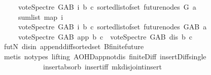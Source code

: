 \begin{isabellebody}
\ \ \ \ \ {\isacharparenleft}{\kern0pt}vote{\isacharunderscore}{\kern0pt}Spectre\ G{\isacharunderscore}{\kern0pt}AB\ i\ b\ c{\isacharparenright}{\kern0pt}{\isacharparenright}{\kern0pt}\ {\isacharparenleft}{\kern0pt}sorted{\isacharunderscore}{\kern0pt}list{\isacharunderscore}{\kern0pt}of{\isacharunderscore}{\kern0pt}set\ {\isacharparenleft}{\kern0pt}future{\isacharunderscore}{\kern0pt}nodes\ G\ a{\isacharparenright}{\kern0pt}{\isacharparenright}{\kern0pt}{\isacharparenright}{\kern0pt}\isanewline
\ \ \ \ {\isacharequal}{\kern0pt}\ sum{\isacharunderscore}{\kern0pt}list\ {\isacharparenleft}{\kern0pt}map\ {\isacharparenleft}{\kern0pt}{\isasymlambda}i{\isachardot}{\kern0pt}\isanewline
\ \ \ \ \ {\isacharparenleft}{\kern0pt}vote{\isacharunderscore}{\kern0pt}Spectre\ G{\isacharunderscore}{\kern0pt}AB\ i\ b\ c{\isacharparenright}{\kern0pt}{\isacharparenright}{\kern0pt}\ {\isacharparenleft}{\kern0pt}sorted{\isacharunderscore}{\kern0pt}list{\isacharunderscore}{\kern0pt}of{\isacharunderscore}{\kern0pt}set\ {\isacharparenleft}{\kern0pt}future{\isacharunderscore}{\kern0pt}nodes\ G{\isacharunderscore}{\kern0pt}AB\ a{\isacharparenright}{\kern0pt}{\isacharparenright}{\kern0pt}{\isacharparenright}{\kern0pt}\isanewline
\ \ \ \ {\isacharminus}{\kern0pt}\ {\isacharparenleft}{\kern0pt}vote{\isacharunderscore}{\kern0pt}Spectre\ G{\isacharunderscore}{\kern0pt}AB\ app\ b\ c{\isacharparenright}{\kern0pt}\ {\isacharminus}{\kern0pt}\ {\isacharparenleft}{\kern0pt}vote{\isacharunderscore}{\kern0pt}Spectre\ G{\isacharunderscore}{\kern0pt}AB\ dis\ b\ c{\isacharparenright}{\kern0pt}{\isachardoublequoteclose}\isanewline
\ \ \ \ \ \ \ \ \isamarkupfalse%
\ futN\ disin\ append{\isacharunderscore}{\kern0pt}diff{\isacharunderscore}{\kern0pt}sorted{\isacharunderscore}{\kern0pt}set\ B{}{\isachardot}{\kern0pt}finite{\isacharunderscore}{\kern0pt}future\isanewline
\ \ \ \ \ \ \ \ \isamarkupfalse%
\ {\isacharparenleft}{\kern0pt}metis\ {\isacharparenleft}{\kern0pt}no{\isacharunderscore}{\kern0pt}types{\isacharcomma}{\kern0pt}\ lifting{\isacharparenright}{\kern0pt}\ AOHD{\isachardot}{\kern0pt}app{\isacharunderscore}{\kern0pt}not{\isacharunderscore}{\kern0pt}dis\ finite{\isacharunderscore}{\kern0pt}Diff\ insert{\isacharunderscore}{\kern0pt}Diff{\isacharunderscore}{\kern0pt}single\isanewline
\ \ \ \ \ \ \ \ \ \ \ \ insert{\isacharunderscore}{\kern0pt}absorb{}\ insert{\isacharunderscore}{\kern0pt}iff\ mk{\isacharunderscore}{\kern0pt}disjoint{\isacharunderscore}{\kern0pt}insert{\isacharparenright}{\kern0pt}\ \isanewline
\ \ \ \ \ \ \isamarkupfalse%

\end{isabellebody}
